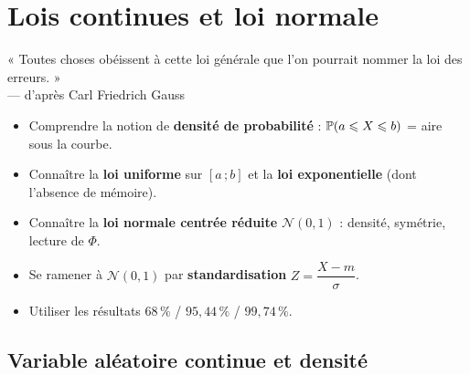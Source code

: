 \chapter{Lois continues et loi normale}

\begin{citationchapitre}
	« Toutes choses obéissent à cette loi générale que l'on pourrait nommer
	la loi des erreurs. »\\[0.4em]
	— d'après Carl Friedrich Gauss
\end{citationchapitre}

\begin{objectifs}
	\begin{itemize}[label=\textbullet]
		\item Comprendre la notion de \textbf{densité de probabilité} :
		$\mathbb{P}(a\leqslant X\leqslant b)$ = aire sous la courbe.
		\item Connaître la \textbf{loi uniforme} sur $[a\,;b]$ et la
		\textbf{loi exponentielle} (dont l'absence de mémoire).
		\item Connaître la \textbf{loi normale centrée réduite}
		$\mathscr{N}(0,1)$ : densité, symétrie, lecture de $\Phi$.
		\item Se ramener à $\mathscr{N}(0,1)$ par \textbf{standardisation}
		$Z=\dfrac{X-m}{\sigma}$.
		\item Utiliser les résultats $68\,\%$ / $95{,}44\,\%$ / $99{,}74\,\%$.
	\end{itemize}
\end{objectifs}


\section{Variable aléatoire continue et densité}

